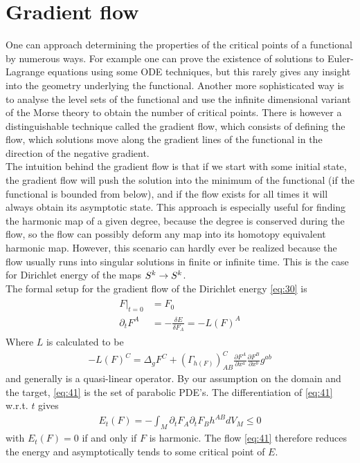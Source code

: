 \section{Gradient flow}
\label{sec:gradient-flow}

One can approach determining the properties of the critical points of
a functional by numerous ways. For example one can prove the existence
of solutions to Euler-Lagrange equations using some ODE techniques,
but this rarely gives any insight into the geometry underlying the
functional. Another more sophisticated way is to analyse the level
sets of the functional and use the infinite dimensional variant of the
Morse theory to obtain the number of critical points. There is however
a distinguishable technique called the gradient flow, which consists
of defining the flow, which solutions move along the gradient lines of
the functional in the direction of the negative gradient.\\


The intuition behind the gradient flow is that if we start with some
initial state, the gradient flow will push the solution into the
minimum of the functional (if the functional is bounded from below),
and if the flow exists for all times it will always obtain its
asymptotic state. This approach is especially useful for finding the
harmonic map of a given degree, because the degree is conserved during
the flow, so the flow can possibly deform any map into its homotopy
equivalent harmonic map. However, this scenario can hardly ever be
realized because the flow usually runs into singular solutions in
finite or infinite time. This is the case for Dirichlet
energy of the maps $S^k\rightarrow S^k$.\\

The formal setup for the gradient flow of the Dirichlet energy
\eqref{eq:30} is
\begin{align}
  \label{eq:41}
    \begin{split}
    F\big|_{t=0}&=F_0\\
    \partial_t F^A&=-\frac{\delta E}{\delta F_A}=-L(F)^A
  \end{split}
\end{align}
Where $L$ is calculated to be
\begin{align}
  \label{eq:43}
  -L(F)^C=\Delta_g F^C+(\Gamma_{h(F)})_{AB}^{C}\frac{\partial
    F^A}{\partial x^a}\frac{\partial F^B}{\partial x^b}g^{ab}
\end{align}
and generally is a quasi-linear operator. By our assumption on the
domain and the target, \eqref{eq:41} is the set of parabolic
PDE's. The differentiation of \eqref{eq:41} w.r.t. $t$ gives
\begin{align}
  \label{eq:40}
  E_t(F)=-\int_M \partial_t F_A\partial_t F_B h^{AB} dV_M\le0
\end{align}
with $E_t(F)=0$ if and only if $F$ is harmonic. The flow \eqref{eq:41}
therefore reduces the energy and asymptotically tends to some
critical point of $E$.\\

